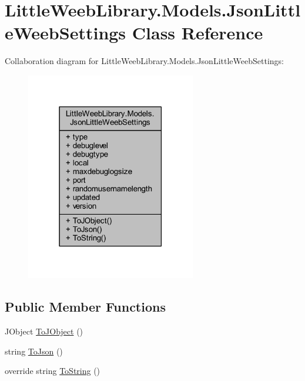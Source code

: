 \hypertarget{class_little_weeb_library_1_1_models_1_1_json_little_weeb_settings}{}\section{Little\+Weeb\+Library.\+Models.\+Json\+Little\+Weeb\+Settings Class Reference}
\label{class_little_weeb_library_1_1_models_1_1_json_little_weeb_settings}


Collaboration diagram for Little\+Weeb\+Library.\+Models.\+Json\+Little\+Weeb\+Settings\+:\nopagebreak
\begin{figure}[H]
\begin{center}
\leavevmode
\includegraphics[width=210pt]{class_little_weeb_library_1_1_models_1_1_json_little_weeb_settings__coll__graph}
\end{center}
\end{figure}
\subsection*{Public Member Functions}
\begin{DoxyCompactItemize}
\item 
J\+Object \mbox{\hyperlink{class_little_weeb_library_1_1_models_1_1_json_little_weeb_settings_ae327fa558c554472183fb37a73ecb6de}{To\+J\+Object}} ()
\item 
string \mbox{\hyperlink{class_little_weeb_library_1_1_models_1_1_json_little_weeb_settings_afb2de66338da820dca2c6c6703008a82}{To\+Json}} ()
\item 
override string \mbox{\hyperlink{class_little_weeb_library_1_1_models_1_1_json_little_weeb_settings_a9aca9f5ee262951043ae1fd7d58d3127}{To\+String}} ()
\end{DoxyCompactItemize}
